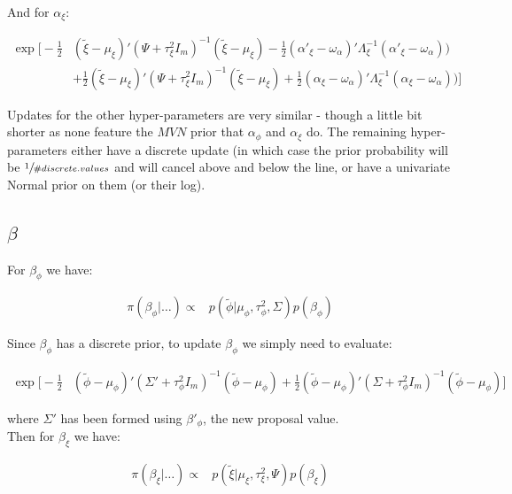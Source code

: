 \documentclass{article}
\begin{document}
And for $\alpha_\xi$:

\begin{align}
\exp \Big[ -\frac{1}{2} & (\tilde{\xi} - \mu_\xi)' (\Psi + \tau^2_\xi I_m)^{-1} (\tilde{\xi} - \mu_\xi) -\frac{1}{2} (\alpha'_\xi - \omega_\alpha)' \Lambda_\xi^{-1} (\alpha'_\xi - \omega_\alpha) ) \nonumber \\
& + \frac{1}{2} (\tilde{\xi} - \mu_\xi)' (\Psi + \tau^2_\xi I_m)^{-1} (\tilde{\xi} - \mu_\xi) + \frac{1}{2} (\alpha_\xi - \omega_\alpha)' \Lambda_\xi^{-1} (\alpha_\xi - \omega_\alpha) )
\Big] \label{eq:2a2}
\end{align}

Updates for the other hyper-parameters are very similar - though a little bit shorter as none feature the $MVN$ prior that $\alpha_\phi$ and $\alpha_\xi$ do. The remaining hyper-parameters either have a discrete update (in which case the prior probability will be $\sfrac{1}{\#discrete.values}$ and will cancel above and below the line, or have a univariate Normal prior on them (or their log). \\

\subsection{$\beta$}

For $\beta_\phi$ we have:

\begin{align*}
\pi(\beta_\phi | \dots ) \propto & p(\tilde{\phi} | \mu_\phi, \tau^2_\phi, \Sigma) p(\beta_\phi)
\end{align*}

Since $\beta_\phi$ has a discrete prior, to update $\beta_\phi$ we simply need to evaluate:

\begin{align}
\exp \Big[ -\frac{1}{2} & (\tilde{\phi} - \mu_\phi)' (\Sigma' + \tau^2_\phi I_m)^{-1} (\tilde{\phi} - \mu_\phi) + \frac{1}{2} (\tilde{\phi} - \mu_\phi)' (\Sigma + \tau^2_\phi I_m)^{-1} (\tilde{\phi} - \mu_\phi) \Big] \label{eq:2b1}
\end{align}

where $\Sigma'$ has been formed using $\beta'_\phi$, the new proposal value. \\

Then for $\beta_\xi$ we have:

\begin{align*}
\pi(\beta_\xi | \dots ) \propto & p(\tilde{\xi} | \mu_\xi, \tau^2_\xi, \Psi) p(\beta_\xi)
\end{align*}
\end{document}
